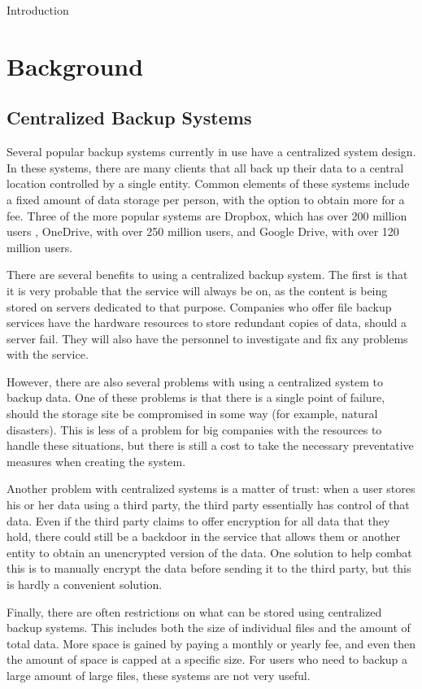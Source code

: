 \documentclass[12pt]{report}
\begin{document}
Introduction


\chapter{Background}
\section{Centralized Backup Systems}
Several popular backup systems currently in use have a centralized system design. In these systems, there are many clients that all back up their data to a central location controlled by a single entity. Common elements of these systems include a fixed amount of data storage per person, with the option to obtain more for a fee. Three of the more popular systems are Dropbox, which has over 200 million users \cite{dropboxusers}, OneDrive, with over 250 million users, and Google Drive, with over 120 million users.

There are several benefits to using a centralized backup system. The first is that it is very probable that the service will always be on, as the content is being stored on servers dedicated to that purpose. Companies who offer file backup services have the hardware resources to store redundant copies of data, should a server fail. They will also have the personnel to investigate and fix any problems with the service.

However, there are also several problems with using a centralized system to backup data. One of these problems is that there is a single point of failure, should the storage site be compromised in some way (for example, natural disasters). This is less of a problem for big companies with the resources to handle these situations, but there is still a cost to take the necessary preventative measures when creating the system.

Another problem with centralized systems is a matter of trust: when a user stores his or her data using a third party, the third party essentially has control of that data. Even if the third party claims to offer encryption for all data that they hold, there could still be a backdoor in the service that allows them or another entity to obtain an unencrypted version of the data. One solution to help combat this is to manually encrypt the data before sending it to the third party, but this is hardly a convenient solution.

Finally, there are often restrictions on what can be stored using centralized backup systems. This includes both the size of individual files and the amount of total data. More space is gained by paying a monthly or yearly fee, and even then the amount of space is capped at a specific size. For users who need to backup a large amount of large files, these systems are not very useful.
\end{document}
